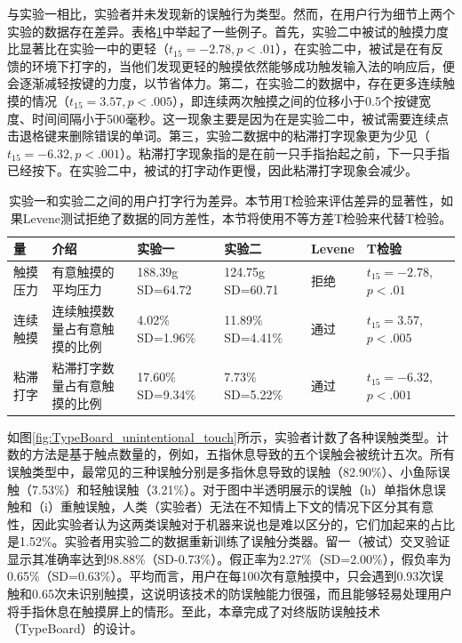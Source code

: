 与实验一相比，实验者并未发现新的误触行为类型。然而，在用户行为细节上两个实验的数据存在差异。表格\ref{tab:behavior_difference}中举起了一些例子。首先，实验二中被试的触摸力度比显著比在实验一中的更轻（$t_{15}=-2.78, p<.01$），在实验二中，被试是在有反馈的环境下打字的，当他们发现更轻的触摸依然能够成功触发输入法的响应后，便会逐渐减轻按键的力度，以节省体力。第二，在实验二的数据中，存在更多连续触摸的情况（$t_{15}=3.57, p<.005$），即连续两次触摸之间的位移小于0.5个按键宽度、时间间隔小于500毫秒。这一现象主要是因为在是实验二中，被试需要连续点击退格键来删除错误的单词。第三，实验二数据中的粘滞打字现象更为少见（$t_{15}=-6.32, p<.001$）。粘滞打字现象指的是在前一只手指抬起之前，下一只手指已经按下。在实验二中，被试的打字动作更慢，因此粘滞打字现象会减少\cite{2018-Observations}。

\begin{table}[htbp]
	\centering
	\begin{tabular}{|p{4em}|p{8em}|p{4.8em}|p{4.8em}|p{3em}|p{6em}|}
		\toprule
		\textbf{量} & \textbf{介绍} & \textbf{实验一} & \textbf{实验二} & \textbf{Levene} & \textbf{T检验} \\
		\toprule
		触摸压力 & 有意触摸的平均压力 & 188.39g SD=64.72 & 124.75g SD=60.71 & 拒绝 & $t_{15}=-2.78$, $p<.01$ \\
		\midrule
		连续触摸 & 连续触摸数量占有意触摸的比例 & 4.02\% SD=1.96\% & 11.89\% SD=4.41\% & 通过  & $t_{15}=3.57$, $p<.005$ \\
		\midrule
		粘滞打字 & 粘滞打字数量占有意触摸的比例 & 17.60\% SD=9.34\% & 7.73\% SD=5.22\% & 通过  & $t_{15}=-6.32$, $p<.001$ \\
		\toprule
	\end{tabular}%
	\caption{实验一和实验二之间的用户打字行为差异。本节用T检验来评估差异的显著性，如果Levene测试拒绝了数据的同方差性，本节将使用不等方差T检验来代替T检验。}
	\label{tab:behavior_difference}%
\end{table}%

如图\ref{fig:TypeBoard_unintentional_touch}所示，实验者计数了各种误触类型。计数的方法是基于触点数量的，例如，五指休息导致的五个误触会被统计五次。所有误触类型中，最常见的三种误触分别是多指休息导致的误触（82.90\%）、小鱼际误触（7.53\%）和轻触误触（3.21\%）。对于图中半透明展示的误触（h）单指休息误触和（i）重触误触，人类（实验者）无法在不知情上下文的情况下区分其有意性，因此实验者认为这两类误触对于机器来说也是难以区分的，它们加起来的占比是1.52\%。实验者用实验二的数据重新训练了误触分类器。留一（被试）交叉验证显示其准确率达到98.88\%（SD-0.73\%）。假正率为2.27\%（SD=2.00\%），假负率为0.65\%（SD=0.63\%）。平均而言，用户在每100次有意触摸中，只会遇到0.93次误触和0.65次未识别触摸，这说明该技术的防误触能力很强，而且能够轻易处理用户将手指休息在触摸屏上的情形。至此，本章完成了对终版防误触技术（TypeBoard）的设计。

